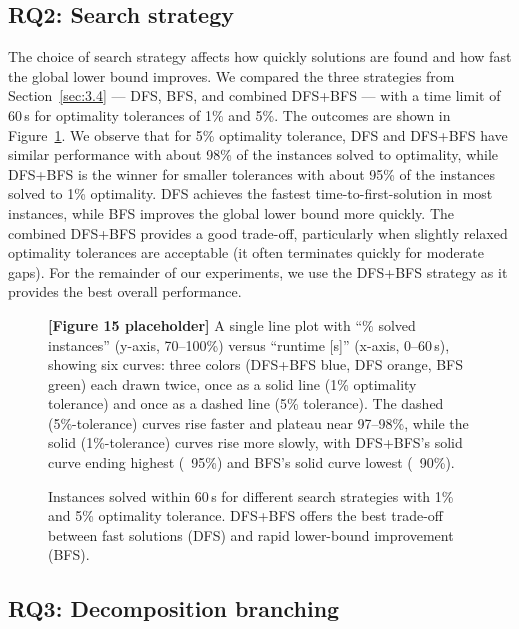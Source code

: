 \documentclass[11pt,a4paper]{article}
\theoremstyle{plain}
\begin{document}
\subsection{RQ2: Search strategy}

The choice of search strategy affects how quickly solutions are found and how fast the global lower bound improves. We compared the three strategies from Section~\ref{sec:3.4} --- DFS, BFS, and combined DFS+BFS --- with a time limit of 60\,s for optimality tolerances of 1\% and 5\%. The outcomes are shown in Figure~\ref{fig:15}. We observe that for 5\% optimality tolerance, DFS and DFS+BFS have similar performance with about 98\% of the instances solved to optimality, while DFS+BFS is the winner for smaller tolerances with about 95\% of the instances solved to 1\% optimality. DFS achieves the fastest time-to-first-solution in most instances, while BFS improves the global lower bound more quickly. The combined DFS+BFS provides a good trade-off, particularly when slightly relaxed optimality tolerances are acceptable (it often terminates quickly for moderate gaps). For the remainder of our experiments, we use the DFS+BFS strategy as it provides the best overall performance.

\begin{figure}[h]
\centering
\begin{figplaceholder}
\textbf{[Figure 15 placeholder]} A single line plot with ``\% solved instances'' (y-axis, 70--100\%) versus ``runtime [s]'' (x-axis, 0--60\,s), showing six curves: three colors (DFS+BFS blue, DFS orange, BFS green) each drawn twice, once as a solid line (1\% optimality tolerance) and once as a dashed line (5\% tolerance). The dashed (5\%-tolerance) curves rise faster and plateau near 97--98\%, while the solid (1\%-tolerance) curves rise more slowly, with DFS+BFS's solid curve ending highest (~95\%) and BFS's solid curve lowest (~90\%).
\end{figplaceholder}
\caption{Instances solved within 60\,s for different search strategies with 1\% and 5\% optimality tolerance. DFS+BFS offers the best trade-off between fast solutions (DFS) and rapid lower-bound improvement (BFS).}
\label{fig:15}
\end{figure}

\subsection{RQ3: Decomposition branching}
\end{document}
